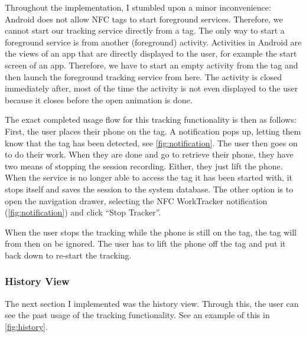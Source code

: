 \documentclass[conference]{IEEEtran}
\newcommand{\projectname}{NFC WorkTracker}
\begin{document}
Throughout the implementation, I stumbled upon a minor inconvenience: Android does not allow NFC tags to start foreground services. Therefore, we cannot start our tracking service directly from a tag. The only way to start a foreground service is from another (foreground) activity. Activities in Android are the views of an app that are directly displayed to the user, for example the start screen of an app. Therefore, we have to start an empty activity from the tag and then launch the foreground tracking service from here. The activity is closed immediately after, most of the time the activity is not even displayed to the user because it closes before the open animation is done.

The exact completed usage flow for this tracking functionality is then as follows: First, the user places their phone on the tag. A notification pops up, letting them know that the tag has been detected, see \cref{fig:notification}. The user then goes on to do their work. When they are done and go to retrieve their phone, they have two means of stopping the session recording. Either, they just lift the phone. When the service is no longer able to access the tag it has been started with, it stops itself and saves the session to the system database. The other option is to open the navigation drawer, selecting the \projectname{} notification (\cref{fig:notification}) and click ``Stop Tracker''.

When the user stops the tracking while the phone is still on the tag, the tag will from then on be ignored. The user has to lift the phone off the tag and put it back down to re-start the tracking.

\subsubsection{History View}
The next section I implemented was the history view. Through this, the user can see the past usage of the tracking functionality. See an example of this in \cref{fig:history}.
\end{document}
